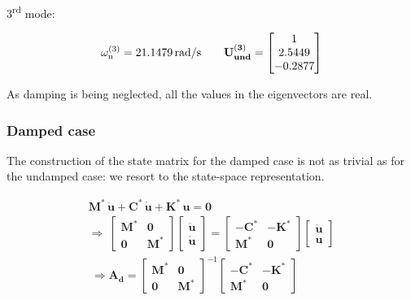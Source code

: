 \documentclass[a4paper,12pt,oneside]{article}
\begin{document}
\vspace{5pt}

\begin{center}
	3\textsuperscript{rd} mode:
\end{center}
\[
	\omega_\textup{n}^{(3)} = 21.1479 \, \text{rad/s} \hspace{20pt}
		\mathbf{U_{und}^{(3)}} =	\begin{bmatrix}
													1 \\
													2.5449 \\
													-0.2877
												\end{bmatrix}
\]

As damping is being neglected, all the values in the eigenvectors are real.

\subsubsection*{Damped case}
\label{ssubs:damped_parameters}

The construction of the state matrix for the damped case is not as trivial as for the undamped case: we resort to the state-space representation.

\[ \begin{split}
	\mathbf{M^*} \, \ddot{\mathbf{u}} + \mathbf{C^*} \, \dot{\mathbf{u}} +
		\mathbf{K^*} \, \mathbf{u} = \mathbf{0} \\[10pt]
	\Rightarrow ~ \begin{bmatrix}
									\mathbf{M^*}	& \mathbf{0} \\
									\mathbf{0}		& \mathbf{M^*}
								\end{bmatrix}
								\begin{bmatrix}
									\ddot{\mathbf{u}} \\
									\dot{\mathbf{u}}
								\end{bmatrix} =
								\begin{bmatrix}
									- \mathbf{C^*}	& - \mathbf{K^*} \\
									\mathbf{M^*}		& \mathbf{0}
								\end{bmatrix}
								\begin{bmatrix}
									\dot{\mathbf{u}} \\
									\mathbf{u}
								\end{bmatrix} \\[10pt]
	~ \Rightarrow \mathbf{A_d} =	\begin{bmatrix}
																	\mathbf{M^*}	& \mathbf{0} \\
																	\mathbf{0}		& \mathbf{M^*}
																\end{bmatrix}^{-1}
																\begin{bmatrix}
																	- \mathbf{C^*}	& - \mathbf{K^*} \\
																	\mathbf{M^*}		& \mathbf{0}
																\end{bmatrix}
\end{split} \]
\end{document}

